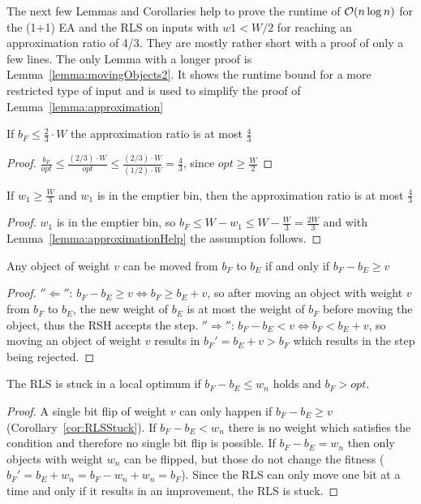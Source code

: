 The next few Lemmas and Corollaries help to prove the runtime of $\mathcal{O}(n\log{n})$ for the (1+1) EA and the RLS on inputs with $w1<W/2$ for reaching an approximation ratio of 4/3.
They are mostly rather short with a proof of only a few lines.
The only Lemma with a longer proof is Lemma~\ref{lemma:movingObjects2}.
It shows the runtime bound for a more restricted type of input and is used to simplify the proof of Lemma~\ref{lemma:approximation}

\begin{lemma}\label{lemma:approximationHelp}
    If \(b_F \le \frac{2}{3} \cdot W\) the approximation ratio is at most $\frac{4}{3}$
\end{lemma}
\begin{proof}
    \(\frac{b_F}{opt} \le \frac{(2/3) \cdot W}{opt} \le \frac{(2/3) \cdot W}{(1/2) \cdot W} = \frac{4}{3}\), since \(opt \ge \frac{W}{2}\)
\end{proof}

\begin{corollary}\label{cor:approximationHelp}
    If \(w_1 \ge \frac{W}{3}\) and \(w_1\) is in the emptier bin, then the approximation ratio is at most $\frac{4}{3}$
\end{corollary}
\begin{proof}
    $w_1$ is in the emptier bin, so \( b_F \le W - w_1 \le W - \frac{W}{3} = \frac{2W}{3} \) and with Lemma~\ref{lemma:approximationHelp} the assumption follows.
\end{proof}

\begin{lemma}\label{lemma:movingObjects}
    Any object of weight $v$ can be moved from $b_F$ to $b_E$ if and only if \(b_F - b_E \ge v\)
\end{lemma}
\begin{proof}
    $''\Leftarrow''$:\newline
    \(b_F - b_E \ge v \Leftrightarrow b_F \ge b_E + v\), so after moving an object with weight $v$ from $b_F$ to $b_E$, the new weight of $b_E$ is at most the weight of $b_F$ before moving the object, thus the RSH accepts the step.\newline
    $''\Rightarrow''$:\newline
    \(b_F - b_E < v \Leftrightarrow b_F < b_E + v\), so moving an object of weight $v$ results in ${b_F}' = b_E+v > b_F$ which results in the step being rejected.
\end{proof}

\begin{corollary}\label{cor:RLSStuck}
    The RLS is stuck in a local optimum if \(b_F-b_E \le w_n\) holds and \(b_F > opt\).
\end{corollary}
\begin{proof}
    A single bit flip of weight $v$ can only happen if \(b_F - b_E \ge v\) (Corollary~\ref{cor:RLSStuck}). If \(b_F-b_E < w_n\) there is no weight which satisfies the condition and therefore no single bit flip is possible.
    If \(b_F-b_E = w_n\) then only objects with weight \(w_n\) can be flipped, but those do not change the fitness ($b_F' = b_E + w_n = b_F - w_n +w_n = b_F$).
    Since the RLS can only move one bit at a time and only if it results in an improvement, the RLS is stuck.
\end{proof}

